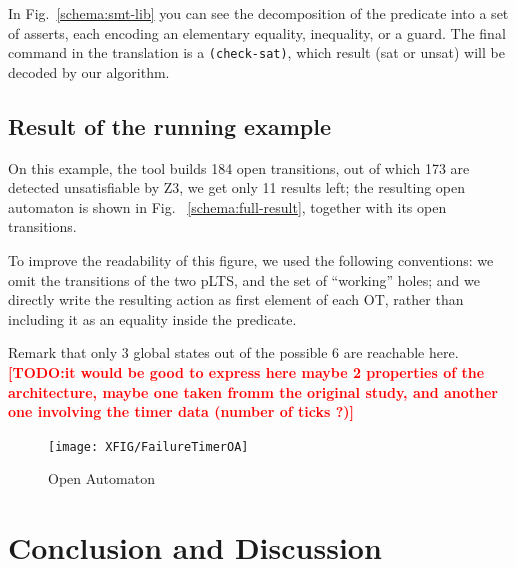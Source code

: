 \documentclass{lncs/llncs}
\newcommand{\TODO}[1]{\textcolor{red}{\textbf{[TODO:#1]}}}
\begin{document}
In Fig.~\ref{schema:smt-lib} you can see the decomposition of the
predicate into a set of asserts, each encoding an elementary equality,
inequality, or a guard. The final command in the translation is a
\texttt{(check-sat)}, which result (sat or unsat) will be decoded by
our algorithm.


\subsection{Result of the running example}
\label{section:full-result}

On this example, the tool builds 184 open
transitions, out of which 173 are detected unsatisfiable by Z3, we
get only 11 results left; the resulting open automaton is shown in
Fig. ~\ref{schema:full-result}, together with its open transitions.

To improve the readability of this figure, we used the following conventions:
we omit the transitions of the two pLTS, and the set of ``working''
holes; and we directly write the resulting action as first element of
each OT, rather than including it as an equality inside the
predicate. 

Remark that only 3 global states out of the possible 6 are reachable
here. \TODO{it would be good to express here maybe 2 properties of the
  architecture, maybe one taken fromm the original study, and another
  one involving the timer data (number of ticks ?)}

\begin{figure}[t]
   \centerline{\texttt{[image: XFIG/FailureTimerOA]}}
   \caption{Open Automaton}  \label{schema:resultOA}
 \end{figure}



\section{Conclusion and Discussion}
\label{section:conclusion}
\end{document}
